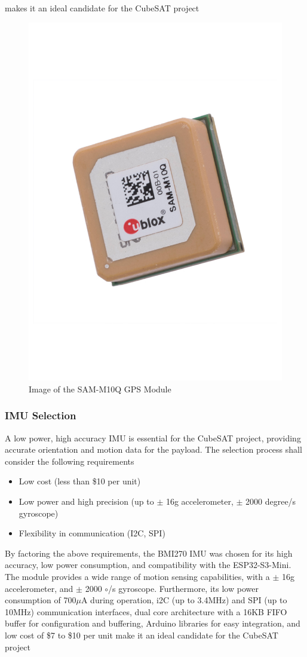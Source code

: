 \documentclass{report}
\begin{document}
                    makes it an ideal candidate for the CubeSAT project \cite{sammdatasheet}
                    \begin{figure}[H]
                        \centering
                        \includegraphics[width=0.3\linewidth, angle=10]{figures/GPS_IMG.pdf}
                        \caption{Image of the SAM-M10Q GPS Module}
                        \label{fig:gps_img}
                    \end{figure}
                \subsubsection{IMU Selection}
                    A low power, high accuracy IMU is essential for the CubeSAT project, providing
                    accurate orientation and motion data for the payload. The selection process shall
                    consider the following requirements
                    \begin{itemize}
                        \item Low cost (less than \$10 per unit)
                        \item Low power and high precision (up to $\pm$ 16g accelerometer, $\pm$ 2000 degree/s gyroscope)
                        \item Flexibility in communication (I2C, SPI)
                    \end{itemize}
                    By factoring the above requirements, the BMI270 IMU was chosen for its high accuracy,
                    low power consumption, and compatibility with the ESP32-S3-Mini. The module provides
                    a wide range of motion sensing capabilities, with a $\pm$ 16g accelerometer, and $\pm$ 2000 $\circ$/s gyroscope.
                    Furthermore, its low power consumption of 700$\mu$A during operation, i2C (up to 3.4MHz) and SPI (up to 10MHz) communication
                    interfaces, dual core architecture with a 16KB FIFO buffer for configuration and buffering,
                    Arduino libraries for easy integration, and low cost of \$7 to \$10 per unit make it an ideal candidate for the CubeSAT project \cite{bmidatasheet}
\end{document}
